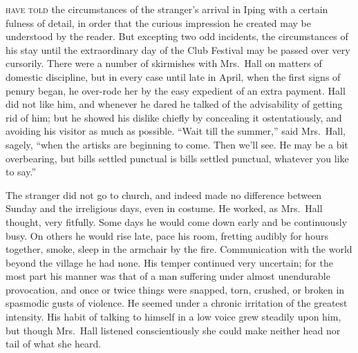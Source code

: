 \label{ch:04}
\begin{ChapterStart}
\vspace*{2\nbs}

\vspace{1.5\nbs}
\vspace{0.75\nbs}
\end{ChapterStart}

\textsc{have told} the circumstances of the stranger’s arrival in Iping with a certain fulness of detail, in order that the curious impression he created may be understood by the reader. But excepting two odd incidents, the circumstances of his stay until the extraordinary day of the Club Festival may be passed over very cursorily. There were a number of skirmishes with Mrs.\ Hall on matters of domestic discipline, but in every case until late in April, when the first signs of penury began, he over-rode her by the easy expedient of an extra payment. Hall did not like him, and whenever he dared he talked of the advisability of getting rid of him; but he showed his dislike chiefly by concealing it ostentatiously, and avoiding his visitor as much as possible. “Wait till the summer,” said Mrs.\ Hall, sagely, “when the artisks are beginning to come. Then we’ll see. He may be a bit overbearing, but bills settled punctual is bills settled punctual, whatever you like to say.”

The stranger did not go to church, and indeed made no difference between Sunday and the irreligious days, even in costume. He worked, as Mrs.\ Hall thought, very fitfully. Some days he would come down early and be continuously busy. On others he would rise late, pace his room, fretting audibly for hours together, smoke, sleep in the armchair by the fire. Communication with the world beyond the village he had none. His temper continued very uncertain; for the most part his manner was that of a man suffering under almost unendurable provocation, and once or twice things were snapped, torn, crushed, or broken in spasmodic gusts of violence. He seemed under a chronic irritation of the greatest intensity. His habit of talking to himself in a low voice grew steadily upon him, but though Mrs.\ Hall listened conscientiously she could make neither head nor tail of what she heard.

